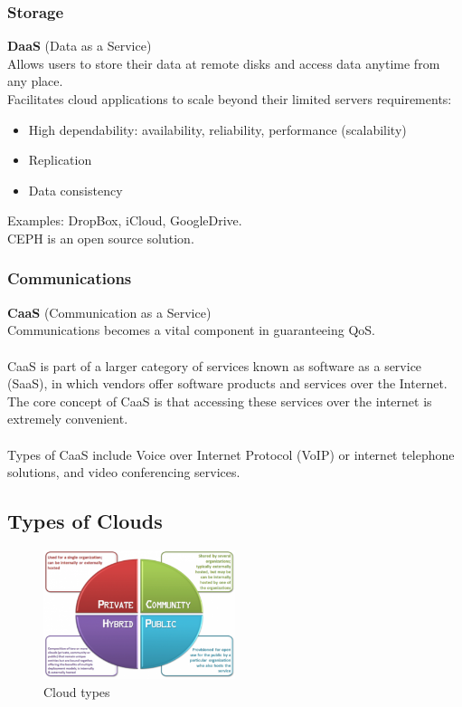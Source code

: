 \documentclass[10pt, oneside]{article}
\begin{document}
\subsubsection*{Storage}
{\bf DaaS} (Data as a Service)\\
Allows users to store their data at remote disks and access data anytime from any place.\\
Facilitates cloud applications to scale beyond their limited servers requirements:\begin{itemize}
    \item High dependability: availability, reliability, performance (scalability)
    \item Replication
    \item Data consistency
\end{itemize}
Examples: DropBox, iCloud, GoogleDrive.\\CEPH is an open source solution.

\subsubsection*{Communications}
{\bf CaaS} (Communication as a Service)\\Communications becomes a vital component in guaranteeing QoS.\\\\CaaS is part of a larger category of services known as software as a service (SaaS), in which vendors offer software products and services over the Internet.\\The core concept of CaaS is that accessing these services over the internet is extremely convenient.\\\\Types of CaaS include Voice over Internet Protocol (VoIP) or internet telephone solutions, and video conferencing services.

\subsection{Types of Clouds}
\begin{figure}[H]
    \begin{center}
    \includegraphics[width=0.5\textwidth]{img/img51.png}
    \caption{Cloud types}
    \label{fig:Cloud types}
    \end{center}
\end{figure}
\end{document}
